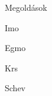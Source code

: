 \begin{spacing}{1.3}
\begin{section}{Megoldások}
   \begin{subsection}{Imo}
   \end{subsection}

   \begin{subsection}{Egmo}
   \end{subsection}
   \hspace{0.5cm}

   \begin{subsection}{Krs}
   \end{subsection}
   \hspace{0.5cm}

   \begin{subsection}{Schev}
   \end{subsection}
	\hspace{0.5cm}


	\newpage
\end{section}
\hspace{2cm}







\end{spacing}

